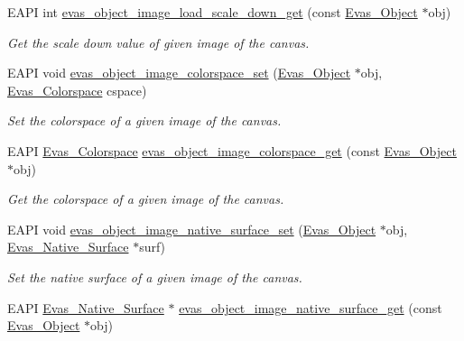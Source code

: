 \begin{DoxyCompactItemize}
EAPI int \hyperlink{group__Evas__Object__Image_ga259c48b3e2a4009e8a10f8e9874d3847}{evas\_\-object\_\-image\_\-load\_\-scale\_\-down\_\-get} (const \hyperlink{group__Evas__Object__Group_ga9e19e6dd1f517a0ba437c0114d3e7c97}{Evas\_\-Object} $\ast$obj)
\begin{DoxyCompactList}\small\item\em Get the scale down value of given image of the canvas. \item\end{DoxyCompactList}\item 
EAPI void \hyperlink{group__Evas__Object__Image_gac352f7b110d7e527bf2d36fba5507d0c}{evas\_\-object\_\-image\_\-colorspace\_\-set} (\hyperlink{group__Evas__Object__Group_ga9e19e6dd1f517a0ba437c0114d3e7c97}{Evas\_\-Object} $\ast$obj, \hyperlink{group__Evas__Object__Image_ga8c6e60db9c8b83b155ccea52957ff656}{Evas\_\-Colorspace} cspace)
\begin{DoxyCompactList}\small\item\em Set the colorspace of a given image of the canvas. \item\end{DoxyCompactList}\item 
EAPI \hyperlink{group__Evas__Object__Image_ga8c6e60db9c8b83b155ccea52957ff656}{Evas\_\-Colorspace} \hyperlink{group__Evas__Object__Image_gaa59339b6adb32081383fa5540641eb42}{evas\_\-object\_\-image\_\-colorspace\_\-get} (const \hyperlink{group__Evas__Object__Group_ga9e19e6dd1f517a0ba437c0114d3e7c97}{Evas\_\-Object} $\ast$obj)
\begin{DoxyCompactList}\small\item\em Get the colorspace of a given image of the canvas. \item\end{DoxyCompactList}\item 
EAPI void \hyperlink{group__Evas__Object__Image_gacbe4ec46460fd3321dd4f6161f09bbed}{evas\_\-object\_\-image\_\-native\_\-surface\_\-set} (\hyperlink{group__Evas__Object__Group_ga9e19e6dd1f517a0ba437c0114d3e7c97}{Evas\_\-Object} $\ast$obj, \hyperlink{Evas_8h_ae35ae0b7b909a9e956836b92d63b493d}{Evas\_\-Native\_\-Surface} $\ast$surf)
\begin{DoxyCompactList}\small\item\em Set the native surface of a given image of the canvas. \item\end{DoxyCompactList}\item 
EAPI \hyperlink{Evas_8h_ae35ae0b7b909a9e956836b92d63b493d}{Evas\_\-Native\_\-Surface} $\ast$ \hyperlink{group__Evas__Object__Image_gabd3effabde6da00dfcac7cf0cfa22280}{evas\_\-object\_\-image\_\-native\_\-surface\_\-get} (const \hyperlink{group__Evas__Object__Group_ga9e19e6dd1f517a0ba437c0114d3e7c97}{Evas\_\-Object} $\ast$obj)

\end{DoxyCompactItemize}
